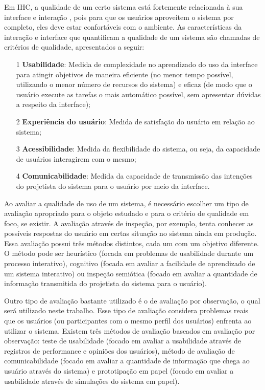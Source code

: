 \indent Em IHC, a qualidade de um certo sistema está fortemente relacionada à sua interface e interação \cite{IHCbook}, pois para que os usuários aproveitem o sistema por completo, eles deve estar confortáveis com o ambiente. As características da interação e interface que quantificam a qualidade de um sistema são chamadas de critérios de qualidade, apresentados a seguir:
\begin{itemize}
\item[1] \textbf{Usabilidade}: Medida de complexidade no aprendizado do uso da interface para atingir objetivos de maneira eficiente (no menor tempo possível, utilizando o menor número de recursos do sistema) e eficaz (de modo que o usuário execute as tarefas o mais automático possível, sem apresentar dúvidas a respeito da interface);
\item[2] \textbf{Experiência do usuário}: Medida de satisfação do usuário em relação ao sistema;
\item[3] \textbf{Acessibilidade}: Medida da flexibilidade do sistema, ou seja, da capacidade de usuários interagirem com o mesmo;
\item[4] \textbf{Comunicabilidade}: Medida da capacidade de transmissão das intenções do projetista do sistema para o usuário por meio da interface. %
\end{itemize}

\indent Ao avaliar a qualidade de uso de um sistema, é necessário escolher um tipo de avaliação apropriado para o objeto estudado e para o critério de qualidade em foco, se existir. A avaliação através de inspeção, por exemplo, tenta conhecer as possíveis respostas do usuário em certas situação no sistema ainda em produção. Essa avaliação possui três métodos distintos, cada um com um objetivo diferente. O método pode ser heurístico (focada em problemas de usabilidade durante um processo interativo), cognitivo (focada em avaliar a facilidade de aprendizado de um sistema interativo) ou inspeção semiótica (focado em avaliar a quantidade de informação transmitida do projetista do sistema para o usuário).

\indent Outro tipo de avaliação bastante utilizado é o de avaliação por observação, o qual será utilizado neste trabalho. Esse tipo de avaliação considera problemas reais que os usuários (ou participantes com o mesmo perfil dos usuários) enfrenta ao utilizar o sistema. Existem três métodos de avaliação baseados em avaliação por observação: teste de usabilidade (focado em avaliar a usabilidade através de registros de performance e opiniões dos usuários), método de avaliação de comunicabilidade (focado em avaliar a quantidade de informação que chega ao usuário através do sistema) e prototipação em papel (focado em avaliar a usabilidade através de simulações do sistema em papel).  

